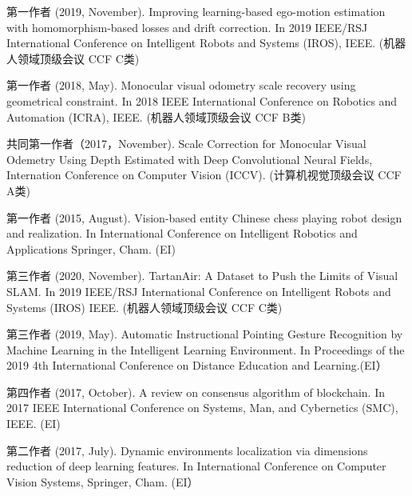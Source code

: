 

\begin{enumerate}[{[}1{]}]
\item 第一作者 (2019, November).
 Improving learning-based ego-motion estimation with homomorphism-based losses and drift correction. 
 In 2019 IEEE/RSJ International Conference on Intelligent Robots and Systems (IROS),  IEEE. (机器人领域顶级会议 CCF C类)
\item 第一作者 (2018, May). 
Monocular visual odometry scale recovery using geometrical constraint. 
In 2018 IEEE International Conference on Robotics and Automation (ICRA), IEEE. (机器人领域顶级会议 CCF B类)
\item 共同第一作者（2017，November).
Scale Correction for Monocular Visual Odemetry Using Depth Estimated with Deep Convolutional Neural Fields,
 Internation Conference on Computer Vision (ICCV). (计算机视觉顶级会议 CCF A类)
\item 第一作者 (2015, August).
 Vision-based entity Chinese chess playing robot design and realization. 
 In International Conference on Intelligent Robotics and Applications Springer, Cham. (EI)
 \item 第三作者 (2020, November). 
 TartanAir: A Dataset to Push the Limits of Visual SLAM.
 In 2019 IEEE/RSJ International Conference on Intelligent Robots and Systems (IROS) IEEE. (机器人领域顶级会议 CCF C类)
 \item 第三作者 (2019, May).
  Automatic Instructional Pointing Gesture Recognition by Machine Learning in the Intelligent Learning Environment.
 In Proceedings of the 2019 4th International Conference on Distance Education and Learning.(EI）
 \item 第四作者 (2017, October).
 A review on consensus algorithm of blockchain. 
 In 2017 IEEE International Conference on Systems, Man, and Cybernetics (SMC), IEEE. (EI)
 \item 第二作者 (2017, July). 
 Dynamic environments localization via dimensions reduction of deep learning features.
  In International Conference on Computer Vision Systems, Springer, Cham. (EI）

\iffalse
\item 第三作者 (2018).
 Novel view synthesis for large-scale scene using adversarial loss. 
 arXiv preprint arXiv:1802.07064. （预印版）
 \fi
\end{enumerate}

